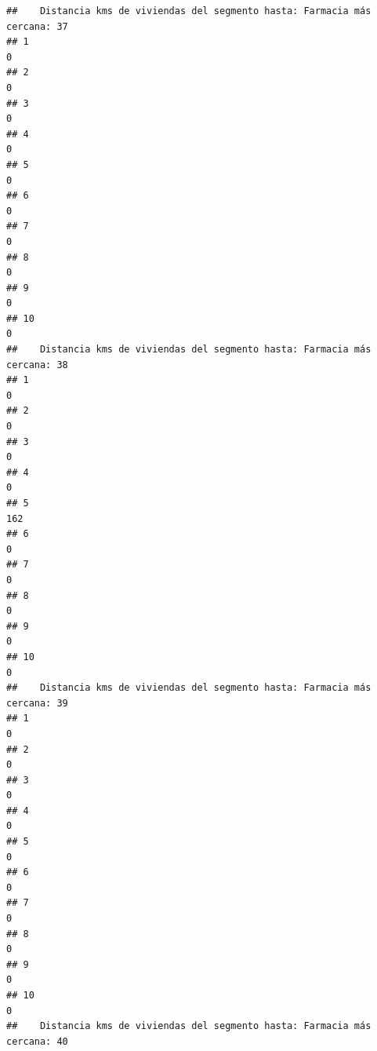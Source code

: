 \documentclass[11pt,]{article}
\begin{document}
\begin{verbatim}
##    Distancia kms de viviendas del segmento hasta: Farmacia más cercana: 37
## 1                                                                        0
## 2                                                                        0
## 3                                                                        0
## 4                                                                        0
## 5                                                                        0
## 6                                                                        0
## 7                                                                        0
## 8                                                                        0
## 9                                                                        0
## 10                                                                       0
##    Distancia kms de viviendas del segmento hasta: Farmacia más cercana: 38
## 1                                                                        0
## 2                                                                        0
## 3                                                                        0
## 4                                                                        0
## 5                                                                      162
## 6                                                                        0
## 7                                                                        0
## 8                                                                        0
## 9                                                                        0
## 10                                                                       0
##    Distancia kms de viviendas del segmento hasta: Farmacia más cercana: 39
## 1                                                                        0
## 2                                                                        0
## 3                                                                        0
## 4                                                                        0
## 5                                                                        0
## 6                                                                        0
## 7                                                                        0
## 8                                                                        0
## 9                                                                        0
## 10                                                                       0
##    Distancia kms de viviendas del segmento hasta: Farmacia más cercana: 40

\end{verbatim}
\end{document}
